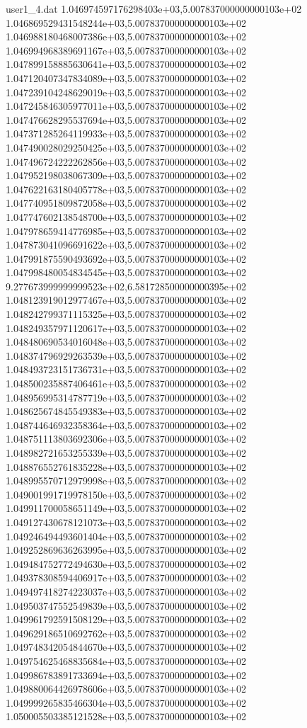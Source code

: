 \begin{filecontents}{user1_4.dat}
1.046974597176298403e+03,5.007837000000000103e+02
1.046869529431548244e+03,5.007837000000000103e+02
1.046988180468007386e+03,5.007837000000000103e+02
1.046994968389691167e+03,5.007837000000000103e+02
1.047899158885630641e+03,5.007837000000000103e+02
1.047120407347834089e+03,5.007837000000000103e+02
1.047239104248629019e+03,5.007837000000000103e+02
1.047245846305977011e+03,5.007837000000000103e+02
1.047476628295537694e+03,5.007837000000000103e+02
1.047371285264119933e+03,5.007837000000000103e+02
1.047490028029250425e+03,5.007837000000000103e+02
1.047496724222262856e+03,5.007837000000000103e+02
1.047952198038067309e+03,5.007837000000000103e+02
1.047622163180405778e+03,5.007837000000000103e+02
1.047740951809872058e+03,5.007837000000000103e+02
1.047747602138548700e+03,5.007837000000000103e+02
1.047978659414776985e+03,5.007837000000000103e+02
1.047873041096691622e+03,5.007837000000000103e+02
1.047991875590493692e+03,5.007837000000000103e+02
1.047998480054834545e+03,5.007837000000000103e+02
9.277673999999999523e+02,6.581728500000000395e+02
1.048123919012977467e+03,5.007837000000000103e+02
1.048242799371115325e+03,5.007837000000000103e+02
1.048249357971120617e+03,5.007837000000000103e+02
1.048480690534016048e+03,5.007837000000000103e+02
1.048374796929263539e+03,5.007837000000000103e+02
1.048493723151736731e+03,5.007837000000000103e+02
1.048500235887406461e+03,5.007837000000000103e+02
1.048956995314787719e+03,5.007837000000000103e+02
1.048625674845549383e+03,5.007837000000000103e+02
1.048744646932358364e+03,5.007837000000000103e+02
1.048751113803692306e+03,5.007837000000000103e+02
1.048982721653255339e+03,5.007837000000000103e+02
1.048876552761835228e+03,5.007837000000000103e+02
1.048995570712979998e+03,5.007837000000000103e+02
1.049001991719978150e+03,5.007837000000000103e+02
1.049911700058651149e+03,5.007837000000000103e+02
1.049127430678121073e+03,5.007837000000000103e+02
1.049246494493601404e+03,5.007837000000000103e+02
1.049252869636263995e+03,5.007837000000000103e+02
1.049484752772494630e+03,5.007837000000000103e+02
1.049378308594406917e+03,5.007837000000000103e+02
1.049497418274223037e+03,5.007837000000000103e+02
1.049503747552549839e+03,5.007837000000000103e+02
1.049961792591508129e+03,5.007837000000000103e+02
1.049629186510692762e+03,5.007837000000000103e+02
1.049748342054844670e+03,5.007837000000000103e+02
1.049754625468835684e+03,5.007837000000000103e+02
1.049986783891733694e+03,5.007837000000000103e+02
1.049880064426978606e+03,5.007837000000000103e+02
1.049999265835466304e+03,5.007837000000000103e+02
1.050005503385121528e+03,5.007837000000000103e+02

\end{filecontents}
